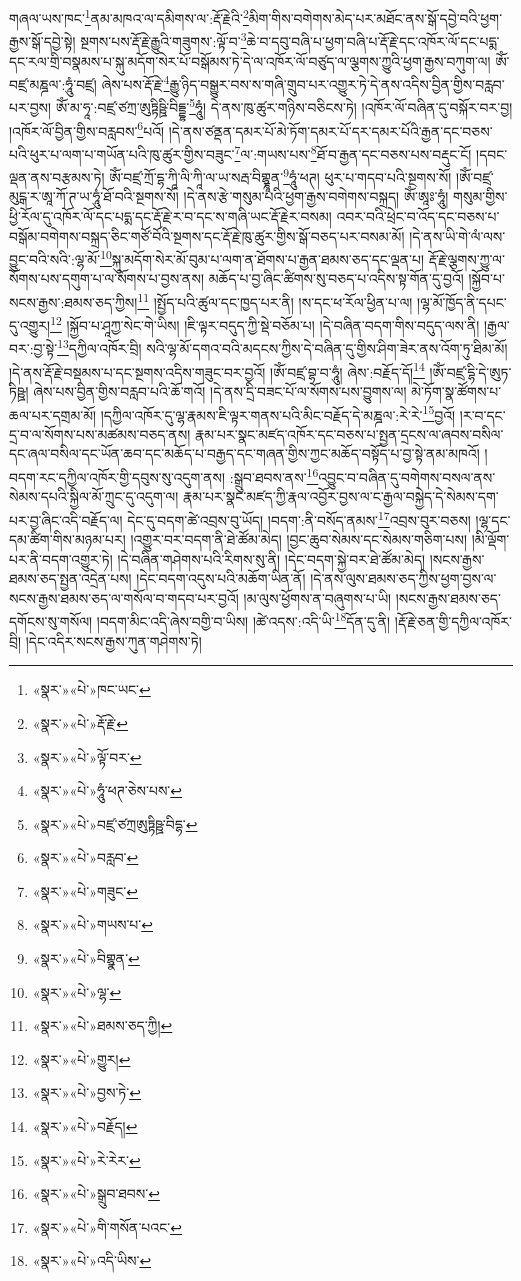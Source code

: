 གཞལ་ཡས་ཁང་\footnote{«སྣར་»«པེ་»ཁང་ཡང་}ནམ་མཁའ་ལ་དམིགས་ལ་:རྡོ་རྗེའི་\footnote{«སྣར་»«པེ་»རྡོ་རྗེ་}མིག་གིས་བགེགས་མེད་པར་མཐོང་ནས་སྒོ་དབྱེ་བའི་ཕྱག་རྒྱས་སྒོ་དབྱེ་སྟེ། སྔགས་པས་རྡོ་རྗེ་རྒྱུའི་གཟུགས་:ལྟོ་བ་\footnote{«སྣར་»«པེ་»ལྟོ་བར་}ཆེ་བ་དབུ་བཞི་པ་ཕྱག་བཞི་པ་རྡོ་རྗེ་དང་འཁོར་ལོ་དང་པདྨ་དང་རལ་གྲི་བསྣམས་པ་སྐུ་མདོག་སེར་པོ་བསྒོམས་ཏེ་དེ་ལ་འཁོར་ལོ་བཙུད་ལ་ལྕགས་ཀྱུའི་ཕྱག་རྒྱས་བཀུག་ལ། ཨོཾ་བཛྲ་མཎྜལ་:ཧཱུཾ་བཛྲ། ཞེས་པས་རྡོ་རྗེ་\footnote{«སྣར་»«པེ་»ཧཱུཾ་ཕཊ་ཅེས་པས་}རྒྱུ་ཉིད་བསྒྱུར་བས་ས་གཞི་གྲུབ་པར་འགྱུར་ཏེ་དེ་ནས་འདིས་བྱིན་གྱིས་བརླབ་པར་བྱས། ཨོཾ་མ་ཧཱ་:བཛྲ་ཙཀྲ་ཨུཏྟིཥྛི་བིདྡྷ་\footnote{«སྣར་»«པེ་»བཛྲ་ཙཀྲཨུཏྟིཥྛ་བིདྷ་}ཧཱུཾ། དེ་ནས་ཁུ་ཚུར་གཉིས་བཅིངས་ཏེ། །འཁོར་ལོ་བཞིན་དུ་བསྐོར་བར་བྱ། །འཁོར་ལོ་བྱིན་གྱིས་བརླབས་\footnote{«སྣར་»«པེ་»བརླབ་}པའོ། །དེ་ནས་ཙནྡན་དམར་པོ་མེ་ཏོག་དམར་པོ་དར་དམར་པོའི་རྒྱན་དང་བཅས་པའི་ཕུར་པ་ལག་པ་གཡོན་པའི་ཁུ་ཚུར་གྱིས་བཟུང་\footnote{«སྣར་»«པེ་»གཟུང་}ལ་:གཡས་པས་\footnote{«སྣར་»«པེ་»གཡས་པ་}ཐོ་བ་རྒྱན་དང་བཅས་པས་བརྡུང་ངོ། །དབང་ལྡན་ནས་བརྩམས་ཏེ། ཨོཾ་བཛྲ་ཀྲོ་དྷ་ཀཱི་ལི་ཀཱི་ལ་ཡ་སརྦ་བིགྷྣཱན་\footnote{«སྣར་»«པེ་»བིགྷྣན་}ཧཱུཾ་ཕཊ། ཕུར་པ་གདབ་པའི་སྔགས་སོ། །ཨོཾ་བཛྲ་མུངྒ་ར་ཨཱ་ཀོ་ཊ་ཡ་ཧཱུཾ་ཐོ་བའི་སྔགས་སོ། །དེ་ནས་རྩེ་གསུམ་པའི་ཕྱག་རྒྱས་བགེགས་བསྐྲད། ཨོཾ་ཨཱཿ་ཧཱུཾ། གསུམ་གྱིས་ཕྱི་རོལ་དུ་འཁོར་ལོ་དང་པདྨ་དང་རྡོ་རྗེ་ར་བ་དང་ས་གཞི་ཡང་རྡོ་རྗེར་བསམ། འབར་བའི་ཕྲེང་བ་འོད་དང་བཅས་པ་བསྒོམ་བགེགས་བསྐྲད་ཅིང་གཙོ་བོའི་སྔགས་དང་རྡོ་རྗེ་ཁུ་ཚུར་གྱིས་སྒོ་བཅད་པར་བསམ་མོ། །དེ་ནས་ཡི་གེ་ལཾ་ལས་བྱུང་བའི་སའི་:ལྷ་མོ་\footnote{«སྣར་»«པེ་»ལྷ་}སྐུ་མདོག་སེར་མོ་བུམ་པ་ལག་ན་ཐོགས་པ་རྒྱན་ཐམས་ཅད་དང་ལྡན་པ། རྡོ་རྗེ་ལྕགས་ཀྱུ་ལ་སོགས་པས་དགུག་པ་ལ་སོགས་པ་བྱས་ནས། མཆོད་པ་བྱ་ཞིང་ཚིགས་སུ་བཅད་པ་འདིས་སྟ་གོན་དུ་བྱའོ། །སྐྱོབ་པ་སངས་རྒྱས་:ཐམས་ཅད་ཀྱིས།\footnote{«སྣར་»«པེ་»ཐམས་ཅད་ཀྱི།} །སྤྱོད་པའི་ཚུལ་དང་ཁྱད་པར་ནི། །ས་དང་ཕ་རོལ་ཕྱིན་པ་ལ། །ལྷ་མོ་ཁྱོད་ནི་དཔང་དུ་འགྱུར།\footnote{«སྣར་»«པེ་»གྱུར།} །སྐྱོབ་པ་ཤཱཀྱ་སེང་གེ་ཡིས། །ཇི་ལྟར་བདུད་ཀྱི་སྡེ་བཅོམ་པ། །དེ་བཞིན་བདག་གིས་བདུད་ལས་ནི། །རྒྱལ་བར་:བྱ་སྟེ་\footnote{«སྣར་»«པེ་»བྱས་ཏེ་}དཀྱིལ་འཁོར་བྲི། སའི་ལྷ་མོ་དགའ་བའི་མདངས་ཀྱིས་དེ་བཞིན་དུ་གྱིས་ཤིག་ཟེར་ནས་འོག་ཏུ་ཐིམ་མོ། །དེ་ནས་རྡོ་རྗེ་བསྡམས་པ་དང་སྔགས་འདིས་གཟུང་བར་བྱའོ། །ཨོཾ་བཛྲ་བྷ་བ་ཧཱུཾ། ཞེས་:བརྗོད་དོ།\footnote{«སྣར་»«པེ་»བརྗོད།} །ཨོཾ་བཛྲ་དྷི་དེ་ཨུཏ་ཏིཥྛ། ཞེས་པས་བྱིན་གྱིས་བརླབ་པའི་ཆོ་གའོ། །དེ་ནས་དྲི་བཟང་པོ་ལ་སོགས་པས་བྱུགས་ལ། མེ་ཏོག་སྣ་ཚོགས་པ་ཆལ་པར་དགྲམ་མོ། །དཀྱིལ་འཁོར་དུ་ལྷ་རྣམས་ཇི་ལྟར་གནས་པའི་མིང་བརྗོད་དེ་མཎྜལ་:རེ་རེ་\footnote{«སྣར་»«པེ་»རེ་རེར་}བྱའོ། །ར་བ་དང་དྲ་བ་ལ་སོགས་པས་མཚམས་བཅད་ནས། རྣམ་པར་སྣང་མཛད་འཁོར་དང་བཅས་པ་སྤྱན་དྲངས་ལ་ཞབས་བསིལ་དང་ཞལ་བསིལ་དང་ཡོན་ཆབ་དང་མཆོད་པ་བརྒྱད་དང་གཞན་གྱིས་ཀྱང་མཆོད་བསྟོད་པ་བྱ་སྟེ་ནམ་མཁའོ། །བདག་རང་དཀྱིལ་འཁོར་གྱི་དབུས་སུ་འདུག་ནས། :སྒྲུབ་ཐབས་ནས་\footnote{«སྣར་»«པེ་»སྒྲུབ་ཐབས་}འབྱུང་བ་བཞིན་དུ་བགེགས་བསལ་ནས་སེམས་དཔའི་སྐྱིལ་མོ་ཀྲུང་དུ་འདུག་ལ། རྣམ་པར་སྣང་མཛད་ཀྱི་རྣལ་འབྱོར་བྱས་ལ་ང་རྒྱལ་བསྐྱེད་དེ་སེམས་དག་པར་བྱ་ཞིང་འདི་བརྗོད་ལ། དེང་དུ་བདག་ཚེ་འབྲས་བུ་ཡོད། །བདག་:ནི་བསོད་ནམས་\footnote{«སྣར་»«པེ་»གི་གསོན་པའང་}འབྲས་བུར་བཅས། །ལྷ་དང་དམ་ཚིག་གིས་མཉམ་པར། །འགྱུར་བར་བདག་ནི་ཐེ་ཚོམ་མེད། །བྱང་ཆུབ་སེམས་དང་སེམས་གཅིག་པས། །མི་ལྡོག་པར་ནི་བདག་འགྱུར་ཏེ། །དེ་བཞིན་གཤེགས་པའི་རིགས་སུ་ནི། །དེང་བདག་སྐྱེ་བར་ཐེ་ཚོམ་མེད། །སངས་རྒྱས་ཐམས་ཅད་སྤྱན་འདྲེན་པས། །དེང་བདག་འདུས་པའི་མཆོག་ཡིན་ནོ། །དེ་ནས་ལུས་ཐམས་ཅད་ཀྱིས་ཕྱག་བྱས་ལ་སངས་རྒྱས་ཐམས་ཅད་ལ་གསོལ་བ་གདབ་པར་བྱའོ། །མ་ལུས་ཕྱོགས་ན་བཞུགས་པ་ཡི། །སངས་རྒྱས་ཐམས་ཅད་དགོངས་སུ་གསོལ། །བདག་མིང་འདི་ཞེས་བགྱི་བ་ཡིས། །ཚེ་འདས་:འདི་ཡི་\footnote{«སྣར་»«པེ་»འདི་ཡིས་}དོན་དུ་ནི། །རྡོ་རྗེ་ཅན་གྱི་དཀྱིལ་འཁོར་བྲི། །དེང་འདིར་སངས་རྒྱས་ཀུན་གཤེགས་ཏེ། 